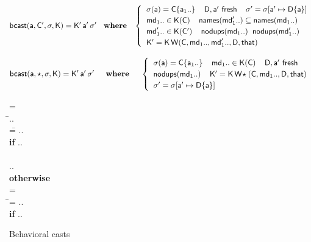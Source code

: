 \documentclass{tex/llncs}
\begin{document}
\begin{figure}[!b]
\hrulefill
\small

\vspace{-4mm}

\begin{equation*}
  \behcastE\a\Cp\s\K \Kp\ap\sp \HS\WHERE\HS \begin{cases}
\HS  \App\s\a = \obj\C{\a[1]..} \HS\HS
  \fresh{\D,\ap} \HS\HS
  \sp = \Map \s{\Bind\ap{\obj\D{\a}}} \\\HS
  \md[1].. \In \App\K\C \HS\HS \names{\mdp[1]..} \subseteq \names{\md[1]..} \\\HS
  \mdp[1].. \In \App\K\Cp \HS\HS \cload{\md[1]..} \HS \cload{\mdp[1]..} \\\HS
  \Kp = \K\,\wrap\C{\md[1]..}{\mdp[1]..}\D\that 

  \end{cases}
\end{equation*}

\begin{equation*}
  \behcastE\a\any\s\K \Kp\ap\sp  \HS\HS\WHERE\HS\HS\begin{cases}\HS
  \App\s\a = \obj\C{\a[1]..} \HS\HS \md[1].. \In \App\K\C \HS\HS
  \fresh{\D,\ap} \\\HS \cload{\md[1]..} \HS\HS
  \Kp = \K\,\wrapAny\C{\md[1]..}\D\that \\\HS
  \sp = \Map \s{\Bind\ap{\obj\D{\a}}} 
\end{cases}\end{equation*}


\hrulefill
\vspace{-2mm}\caption{Behavioral casts}\label{behavetext}

\hrulefill
\small

\begin{tabbing}\small
  \wrap{}\D\that = \\
  \HS\HS\WHERE\HS\= \Mdef\m\x{\t[1]}{\t[2]}\e\In\md[1].. \\
                 \> \mdpp[1] =\= \src{\Mdef\m\x{\tp[1]}{\tp[2]}{~\BehCast{\tp[2]}{\KCall{\FRead\that}\m{\bscast{\tp[1]}\x}{\t[1]}{\t[2]}}}} .. \\
\> \> \HS\HS \= \textbf{if} \HS \Mdef\m\x{\tp[1]}{\tp[2]}\ep\In\mdp[1].. \\
\\[-3mm]
\> \>  \src{\Mdef\m\x{\t[1]}{\t[2]}{~\KCall{\FRead\that}\m{\x}{\t[1]}{\t[2]}}} .. \\ \> \> \HS\HS \textbf{otherwise}
\\[3mm]
   = \\
\HS\HS\WHERE\HS\=\mdp[1] = \src{ \Mdef\m\x{\any}{\any}{~\BehCast\any{ \KCall{\FRead\that} \m {\bscast{\t}\x}{\t}{\tp}} } }   ..
    \HS\HS\HS\HS \\ \> \> \HS\HS \= \textbf{if} \HS \Mdef\m\x{\t}{\tp}\e\In\md[1].. \\
\end{tabbing}


\end{figure}
\end{document}
